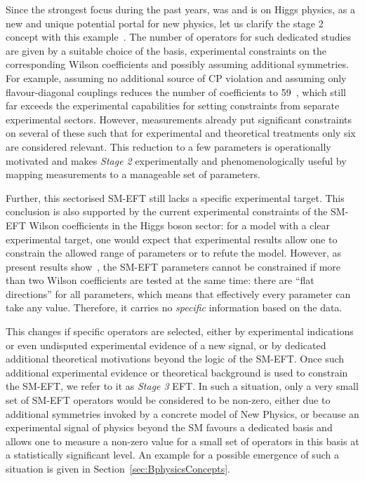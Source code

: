 Since the strongest focus during the past years, was and is on Higgs physics, as a new
and unique potential portal for new physics, let us clarify the stage 2 concept with
this example~\citep{Espinosa:2016ovf}.
The number of operators for such dedicated studies are given by a suitable choice
of the basis, experimental constraints on the corresponding Wilson coefficients and
possibly assuming additional symmetries.
For example, assuming no additional source of CP violation and assuming
only flavour-diagonal couplings reduces the number of coefficients to
59~\citep{Buchmuller:1985jz,Grzadkowski:2010es}, 
which still far exceeds the experimental capabilities for setting
constraints from separate experimental sectors. 
However, measurements already put significant constraints on several of these such that for experimental and theoretical treatments only six are considered relevant.
This reduction to a few parameters is operationally motivated and makes \emph{Stage 2} experimentally and
phenomenologically useful by mapping measurements to a manageable set
of parameters. 

Further, this sectorised SM-EFT still lacks a specific experimental target. 
This conclusion is also
supported by the current experimental constraints of the SM-EFT Wilson
coefficients in the Higgs boson sector: for a model with a clear
experimental target, one would expect that experimental results allow one
to constrain the allowed range of parameters or to refute the
model. However, as present results show~\citep{ATL-PHYS-PUB-2019-042},
the SM-EFT parameters cannot be constrained if more than two Wilson
coefficients are tested at the same time: there are ``flat
directions'' for all parameters, which means that effectively every
parameter can take any value. Therefore, it carries no
\emph{specific} information based on the data.

This changes if specific operators are selected, either by
experimental indications or even undisputed experimental evidence of a
new signal, or by dedicated additional theoretical motivations beyond
the logic of the SM-EFT. Once such additional experimental evidence or
theoretical background is used to constrain the SM-EFT, we refer to it
as \emph{Stage 3} EFT.  In such a situation, only a very small set
of SM-EFT operators would be considered to be non-zero, either due to
additional symmetries invoked by a concrete model of New Physics, or
because an experimental signal of physics beyond the SM favours a
dedicated basis and allows one to measure a non-zero value for a small set
of operators in this basis at a statistically
significant level. An example for a possible emergence of such a
situation is given in Section~\ref{sec:BphysicsConcepts}.

